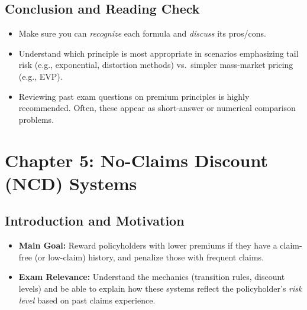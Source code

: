 \documentclass[13pt,a4paper]{article}
\begin{document}
\subsection{Conclusion and Reading Check}
\begin{itemize}
  \item Make sure you can \emph{recognize} each formula and \emph{discuss} its pros/cons.
  \item Understand which principle is most appropriate in scenarios emphasizing tail risk (e.g., exponential, distortion methods) vs.\ simpler mass-market pricing (e.g., EVP).
  \item Reviewing past exam questions on premium principles is highly recommended. Often, these appear as short-answer or numerical comparison problems.
\end{itemize}

\section{Chapter 5: No-Claims Discount (NCD) Systems}
\label{sec:chapter5}

\subsection{Introduction and Motivation}
\begin{itemize}
  \item \textbf{Main Goal:} Reward policyholders with lower premiums if they have a claim-free (or low-claim) history, and penalize those with frequent claims.
  \item \textbf{Exam Relevance:} Understand the mechanics (transition rules, discount levels) and be able to explain how these systems reflect the policyholder's \emph{risk level} based on past claims experience.
\end{itemize}
\end{document}
